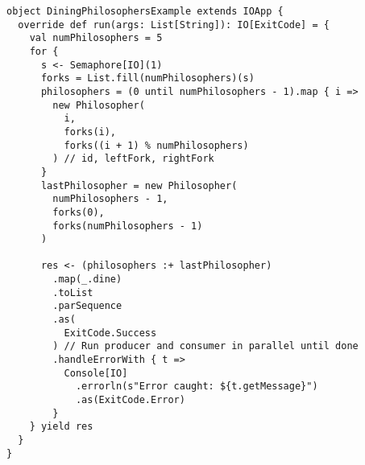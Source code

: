 \begin{verbatim}
object DiningPhilosophersExample extends IOApp {
  override def run(args: List[String]): IO[ExitCode] = {
    val numPhilosophers = 5
    for {
      s <- Semaphore[IO](1)
      forks = List.fill(numPhilosophers)(s)
      philosophers = (0 until numPhilosophers - 1).map { i =>
        new Philosopher(
          i,
          forks(i),
          forks((i + 1) % numPhilosophers)
        ) // id, leftFork, rightFork
      }
      lastPhilosopher = new Philosopher(
        numPhilosophers - 1,
        forks(0),
        forks(numPhilosophers - 1)
      )

      res <- (philosophers :+ lastPhilosopher)
        .map(_.dine)
        .toList
        .parSequence
        .as(
          ExitCode.Success
        ) // Run producer and consumer in parallel until done
        .handleErrorWith { t =>
          Console[IO]
            .errorln(s"Error caught: ${t.getMessage}")
            .as(ExitCode.Error)
        }
    } yield res
  }
} 
\end{verbatim}
